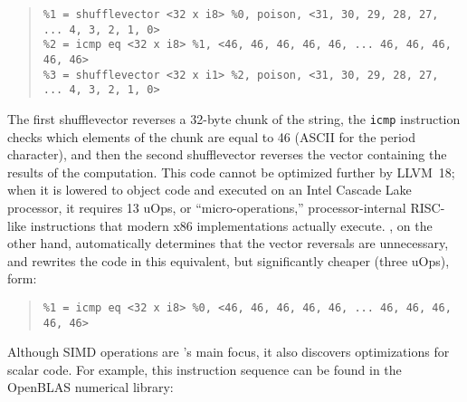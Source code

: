 {\small\begin{quote}
\begin{verbatim}
%1 = shufflevector <32 x i8> %0, poison, <31, 30, 29, 28, 27, ... 4, 3, 2, 1, 0>
%2 = icmp eq <32 x i8> %1, <46, 46, 46, 46, 46, ... 46, 46, 46, 46, 46>
%3 = shufflevector <32 x i1> %2, poison, <31, 30, 29, 28, 27, ... 4, 3, 2, 1, 0>
\end{verbatim}
\end{quote}}


The first shufflevector reverses a 32-byte chunk of the string, the
\texttt{icmp} instruction checks which elements of the chunk are equal
to 46 (ASCII for the period character), and then the second
shufflevector reverses the vector containing the results of the
computation.
%
This code cannot be optimized further by LLVM~18; when it is lowered to
object code and executed on an Intel Cascade Lake processor, it
requires 13 uOps, or ``micro-operations,'' processor-internal
RISC-like instructions that modern x86 implementations actually
execute.
%
\minotaur{}, on the other hand, automatically determines that the vector
reversals are unnecessary, and rewrites the code in this equivalent,
but significantly cheaper (three uOps), form:

{\small\begin{quote}
\begin{verbatim}
%1 = icmp eq <32 x i8> %0, <46, 46, 46, 46, 46, ... 46, 46, 46, 46, 46>
\end{verbatim}
\end{quote}}



Although SIMD operations are \minotaur's main focus, it also discovers
optimizations for scalar code.
%
For example, this instruction sequence can be found in the OpenBLAS
numerical library:

